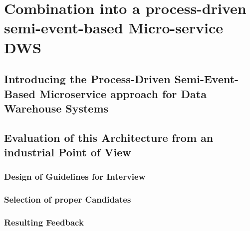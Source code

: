 \section{Combination into a process-driven semi-event-based Micro-service DWS}
\label{sec:finalArchitecture}

\subsection{Introducing the Process-Driven Semi-Event-Based Microservice approach for Data Warehouse Systems}



\subsection{Evaluation of this Architecture from an industrial Point of View}
\subsubsection{Design of Guidelines for Interview}
\subsubsection{Selection of proper Candidates}
\subsubsection{Resulting Feedback}
